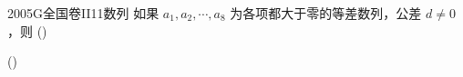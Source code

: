 
\begin{problem}{2005}{G}{全国卷II}{11}{数列}
如果 $ a_1,a_2,\cdots,a_8 $ 为各项都大于零的等差数列，公差 $ d\ne 0 $，则 (\hspace{1cm})

(\hspace{1cm})
\begin{choices}
\end{choices}
\end{problem}

\begin{answer}

\end{answer}

\begin{solutions}

\end{solutions}